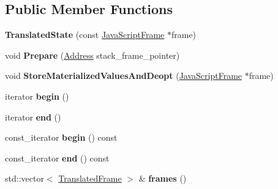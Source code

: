 \subsection*{Public Member Functions}
\begin{DoxyCompactItemize}
\item 
\mbox{\label{classv8_1_1internal_1_1TranslatedState_a61ce2255527cfb6affb239d11418184b}} 
{\bfseries Translated\+State} (const \mbox{\hyperlink{classv8_1_1internal_1_1JavaScriptFrame}{Java\+Script\+Frame}} $\ast$frame)
\item 
\mbox{\label{classv8_1_1internal_1_1TranslatedState_af6da36d8b4ea48fb3f56da5b9a2a69a4}} 
void {\bfseries Prepare} (\mbox{\hyperlink{classuintptr__t}{Address}} stack\+\_\+frame\+\_\+pointer)
\item 
\mbox{\label{classv8_1_1internal_1_1TranslatedState_a57354ec27ce552ad319e9890c1e8192e}} 
void {\bfseries Store\+Materialized\+Values\+And\+Deopt} (\mbox{\hyperlink{classv8_1_1internal_1_1JavaScriptFrame}{Java\+Script\+Frame}} $\ast$frame)
\item 
\mbox{\label{classv8_1_1internal_1_1TranslatedState_a0d7181aec0643e3c070248ee1429acf2}} 
iterator {\bfseries begin} ()
\item 
\mbox{\label{classv8_1_1internal_1_1TranslatedState_a3f7c5ec0be6c661c55a127993baf3e24}} 
iterator {\bfseries end} ()
\item 
\mbox{\label{classv8_1_1internal_1_1TranslatedState_a12d4621144656c39d37ac93338321dfb}} 
const\+\_\+iterator {\bfseries begin} () const
\item 
\mbox{\label{classv8_1_1internal_1_1TranslatedState_a300b169abc28b08f9eb75a2b7e35ef3a}} 
const\+\_\+iterator {\bfseries end} () const
\item 
\mbox{\label{classv8_1_1internal_1_1TranslatedState_a0810bb0c912ff00d226d483cbad42a71}} 
std\+::vector$<$ \mbox{\hyperlink{classv8_1_1internal_1_1TranslatedFrame}{Translated\+Frame}} $>$ \& {\bfseries frames} ()

\end{DoxyCompactItemize}
